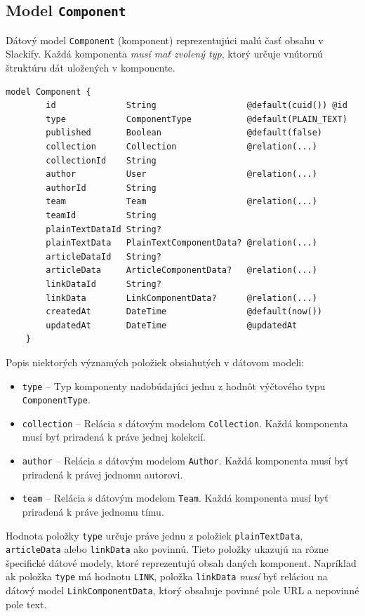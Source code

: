 \subsection{Model \texttt{Component}}
\label{impl:model:component}
Dátový model \texttt{Component} (komponent) reprezentujúci malú časť obsahu v Slackify. Každá komponenta \emph{musí mať zvolený typ}, ktorý určuje vnútornú štruktúru dát uložených v komponente. \\

\begin{lstlisting}[caption=Dátový model \texttt{Component} v konfiguračnom súbore \texttt{prisma}.]
	model Component {
		id              String                  @default(cuid()) @id
		type            ComponentType           @default(PLAIN_TEXT)
		published       Boolean                 @default(false)
		collection      Collection              @relation(...)
		collectionId    String
		author          User                    @relation(...)
		authorId        String
		team            Team                    @relation(...)
		teamId          String
		plainTextDataId String?
		plainTextData   PlainTextComponentData? @relation(...)
		articleDataId   String?
		articleData     ArticleComponentData?   @relation(...)
		linkDataId      String?
		linkData        LinkComponentData?      @relation(...)
		createdAt       DateTime                @default(now())
		updatedAt       DateTime                @updatedAt
	}
\end{lstlisting}

\bigskip

\noindent Popis niektorých významých položiek obsiahutých v dátovom modeli:

\begin{itemize}
	\item \texttt{type} -- Typ komponenty nadobúdajúci jednu z hodnôt výčtového typu \texttt{ComponentType}.
	\item \texttt{collection} -- Relácia s dátovým modelom \texttt{Collection}. Každá komponenta musí byť priradená k práve jednej kolekcií.
	\item \texttt{author} -- Relácia s dátovým modelom \texttt{Author}. Každá komponenta musí byť priradená k právej jednomu autorovi.
	\item \texttt{team} -- Relácia s dátovým modelom \texttt{Team}. Každá komponenta musí byť priradená k práve jednomu tímu.
\end{itemize}

\noindent Hodnota položky \texttt{type} určuje práve jednu z položiek \texttt{plainTextData}, \texttt{articleData} alebo \texttt{linkData} ako povinnú. Tieto položky ukazujú na rôzne špecifické dátové modely, ktoré reprezentujú obsah daných komponent. Napríklad ak položka \texttt{type} má hodnotu \texttt{LINK}, položka \texttt{linkData} \emph{musí} byť reláciou na dátový model \texttt{LinkComponentData}, ktorý obsahuje povinné pole URL a nepovinné pole text. \\

